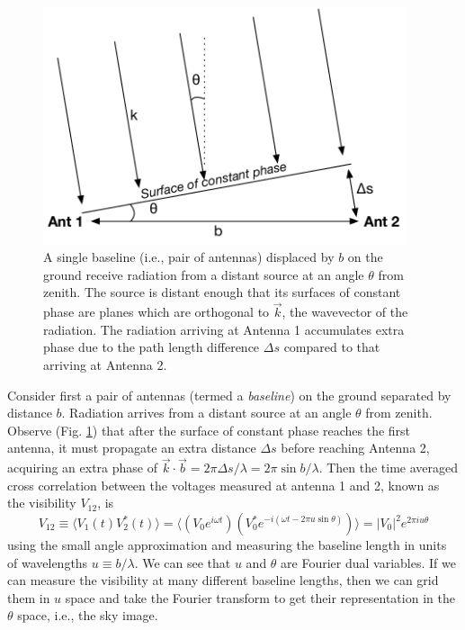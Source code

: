 {\begin{figure}[h]
    \centering
    \includegraphics[width=0.95\textwidth]{chap0_intro/radio_interferometer_diagram.pdf}
    \caption[Diagram of a two element radio interferometer]{A single baseline (i.e., pair of antennas) displaced by $b$ on the ground receive radiation from a distant source at an angle $\theta$ from zenith. The source is distant enough that its surfaces of constant phase are planes which are orthogonal to $\vec{k}$, the wavevector of the radiation. The radiation arriving at Antenna 1 accumulates extra phase due to the path length difference $\Delta s$ compared to that arriving at Antenna 2.}
    \label{fig:radiointerferometerdiagram}
\end{figure}

Consider first a pair of antennas (termed a \textit{baseline}) on the ground separated by distance $b$. Radiation arrives from a distant source at an angle $\theta$ from zenith. Observe (Fig. \ref{fig:radiointerferometerdiagram}) that after the surface of constant phase reaches the first antenna, it must propagate an extra distance $\Delta s$ before reaching Antenna 2, acquiring an extra phase of $\vec{k}\cdot \vec{b}=2\pi\Delta s/\lambda=2\pi\sin b/\lambda$. Then the time averaged cross correlation between the voltages measured at antenna 1 and 2, known as the visibility $V_{12}$, is
\begin{equation}
\label{eqn:vis1D}
	V_{12}\equiv\langle V_1(t)V_2^*(t)\rangle=\langle(V_0 e^{i\omega t})(V_0^*e^{-i(\omega t-2\pi u\sin \theta)})\rangle = |V_0|^2 e^{2\pi i u\theta}
\end{equation}
using the small angle approximation and measuring the baseline length in units of wavelengths $u\equiv b/\lambda$. We can see that $u$ and $\theta$ are Fourier dual variables. If we can measure the visibility at many different baseline lengths, then we can grid them in $u$ space and take the Fourier transform to get their representation in the $\theta$ space, i.e., the sky image.

}
